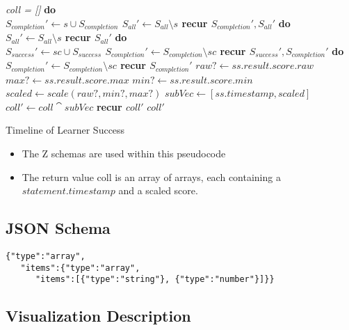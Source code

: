 \documentclass{article}
\begin{document}
\begin{algorithm}[H]
  \SetAlgoLined
  \emph{coll = []}\;
  {
    {
      {\bf do \\
        $S_{completion}' \leftarrow s \cup S_{completion}$\;
        $S_{all}' \leftarrow S_{all} \setminus s$ \;
        recur $S_{completion}', S_{all}'$\;}
      {\bf do \\
        $S_{all}' \leftarrow S_{all} \setminus s$\;
        recur $S_{all}'$\;}}}
  {
    {
      {\bf do \\
        $S_{success}' \leftarrow sc \cup S_{success}$\;
        $S_{completion}' \leftarrow S_{completion} \setminus sc$\;
        recur $S_{success}', S_{completion}'$\;}
      {\bf do \\
        $S_{completion}' \leftarrow S_{completion} \setminus sc$\;
        recur $S_{completion}'$\;}}}
  {
    {$raw? \leftarrow ss.result.score.raw$\;
     $max? \leftarrow ss.result.score.max$\;
     $min? \leftarrow ss.result.score.min$\;
     $scaled \leftarrow scale(raw?, min?, max?)$\;
     $subVec \leftarrow [ss.timestamp, scaled]$\;
     $coll' \leftarrow coll \cat subVec$\;
     {\bf recur $coll'$}}
   \Return $coll'$}
  \caption{Timeline of Learner Success}
\end{algorithm}
\begin{itemize}
\item The Z schemas are used within this pseudocode
\item The return value coll is an array of arrays, each containing a
  $statement.timestamp$ and a scaled score.
\end{itemize}

\subsection{JSON Schema}
\begin{lstlisting}[]
{"type":"array",
   "items":{"type":"array",
      "items":[{"type":"string"}, {"type":"number"}]}}
\end{lstlisting}

\subsection{Visualization Description}
\end{document}
